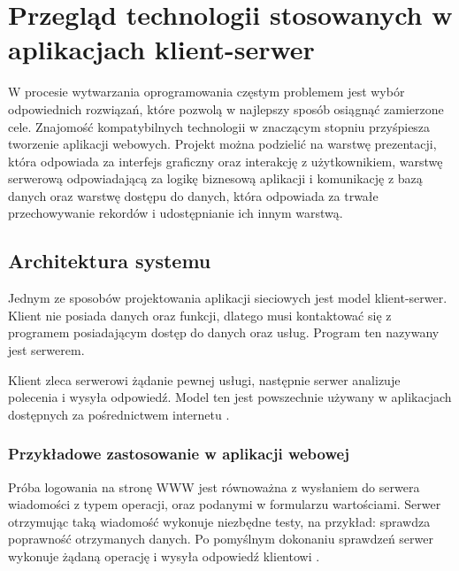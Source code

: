 \chapter{Przegląd technologii stosowanych w aplikacjach klient-serwer}
W procesie wytwarzania oprogramowania częstym problemem jest wybór odpowiednich rozwiązań, które pozwolą w najlepszy sposób osiągnąć zamierzone cele. Znajomość kompatybilnych technologii w znaczącym stopniu przyśpiesza tworzenie aplikacji webowych. Projekt można podzielić na warstwę prezentacji, która odpowiada za interfejs graficzny oraz interakcję z użytkownikiem, warstwę serwerową odpowiadającą za logikę biznesową aplikacji i komunikację z bazą danych oraz warstwę dostępu do danych, która odpowiada za trwałe przechowywanie rekordów i udostępnianie ich innym warstwą.
\section{Architektura systemu}
Jednym ze sposobów projektowania aplikacji sieciowych jest model klient-serwer. Klient nie posiada danych oraz funkcji, dlatego musi kontaktować się z programem posiadającym dostęp do danych oraz usług. Program ten nazywany jest serwerem. 

Klient zleca serwerowi żądanie pewnej usługi, następnie serwer analizuje polecenia i wysyła odpowiedź. Model ten jest powszechnie używany w aplikacjach dostępnych za pośrednictwem internetu \cite{ArchKS}. 

\subsection*{Przykładowe zastosowanie w aplikacji webowej}
Próba logowania na stronę WWW jest równoważna z wysłaniem do serwera wiadomości z typem operacji, oraz podanymi w formularzu wartościami. Serwer otrzymując taką wiadomość wykonuje niezbędne testy, na przykład: sprawdza poprawność otrzymanych danych. Po pomyślnym dokonaniu sprawdzeń serwer wykonuje żądaną operację i wysyła odpowiedź klientowi \cite{ArchKS}.


